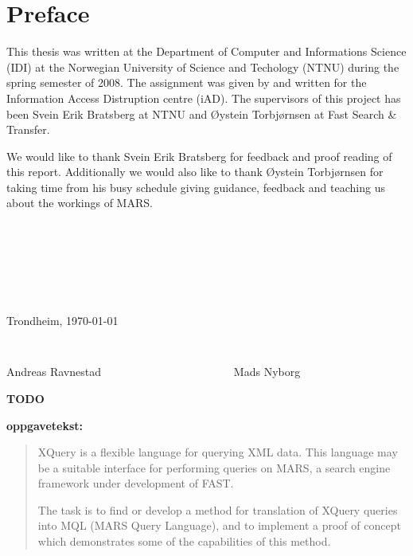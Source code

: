 \chapter*{Preface}

This thesis was written at the Department of Computer and Informations Science
(IDI) at the Norwegian University of Science and Techology (NTNU) during the
spring semester of 2008. The assignment was given by and written for the
Information Access Distruption centre (iAD). The supervisors of this project
has been Svein Erik Bratsberg at NTNU and \O ystein Torbj\o rnsen at Fast
Search \& Transfer.

We would like to thank Svein Erik Bratsberg for feedback and proof reading of
this report. Additionally we would also like to thank \O ystein Torbj\o rnsen
for taking time from his busy schedule giving guidance, feedback and teaching
us about the workings of MARS.

\begin{verbatim}







\end{verbatim}
\begin{center}

Trondheim, \today

\begin{verbatim}


\end{verbatim}
Andreas Ravnestad \verb!                      ! Mads Nyborg
\end{center}

\textbf{\LARGE TODO} 

\textbf{\Large oppgavetekst:} 

\begin{quote}
XQuery is a flexible language for querying XML data. This language may be a
suitable interface for performing queries on MARS, a search engine
framework under development of FAST.

The task is to find or develop a method for translation of XQuery queries into
MQL (MARS Query Language), and to implement a proof of concept which
demonstrates some of the capabilities of this method.

\end{quote}

